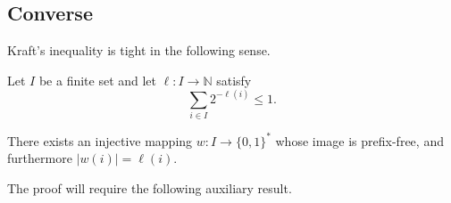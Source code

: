 \pagebreak

\subsection{Converse}

Kraft's inequality is tight in the following sense.

\begin{theorem} \label{thm:kraft-tight}
Let $I$ be a finite set and let $\ell\colon I \to \mathbb{N}$ satisfy
\[
 \sum_{i\in I} 2^{-\ell(i)} \leq 1.
\]

There exists an injective mapping $w \colon I \to \{0,1\}^*$ whose image is prefix-free, and furthermore $|w(i)| = \ell(i)$.
\end{theorem}

The proof will require the following auxiliary result.

